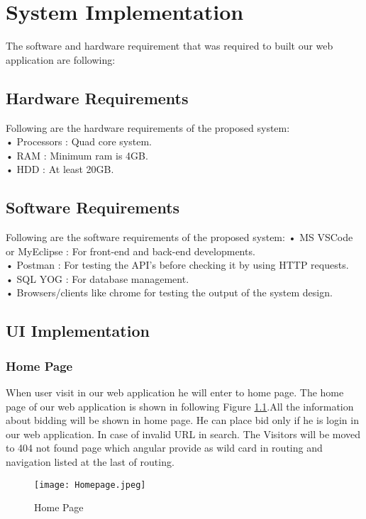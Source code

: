 \doublespacing
\chapter{System Implementation} \label{chap:sysImplementation}

\doublespacing

The software and hardware requirement that was required to built our web application are following:\\
\section{Hardware Requirements}
Following are the hardware requirements of the proposed system:\\
•	Processors : Quad core system.\\
•	RAM : Minimum ram is 4GB.\\
•	HDD : At least 20GB.
\section{Software Requirements}
Following are the software requirements of the proposed system:
•	MS VSCode or MyEclipse : For front-end and back-end developments.\\
•	Postman : For testing the API’s before checking it by using HTTP requests.\\
•	SQL YOG : For database management.\\  
•	Browsers/clients like chrome for testing the output of the system design.
\newpage
\section{UI Implementation}
\subsection{Home Page}
When user visit in our web application he will enter to home page. The home page of our web application is shown in following Figure \ref{HPl}.All the information about bidding will be shown in home page. He can place bid only if he is login in our web application. In case of invalid URL in search. The Visitors  will be moved to 404 not found page which angular provide as wild card in routing and navigation listed at the last of routing.\\
\begin{figure}[h]
    \centering
    \texttt{[image: Homepage.jpeg]}
    \caption{Home Page}
    \label{HPl}
\end{figure}

